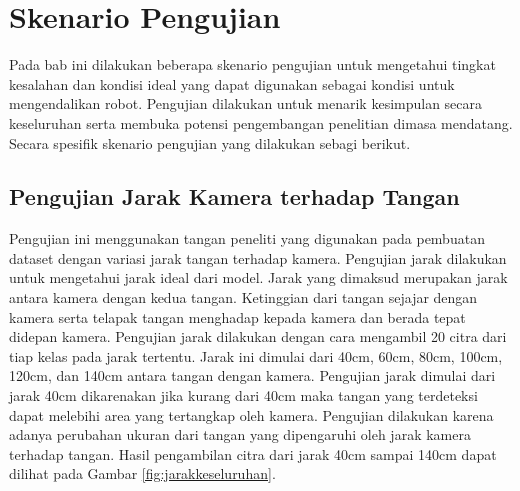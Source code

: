 \section{Skenario Pengujian}
Pada bab ini dilakukan beberapa skenario pengujian untuk mengetahui tingkat kesalahan dan kondisi ideal yang dapat digunakan sebagai kondisi untuk mengendalikan robot. Pengujian dilakukan untuk menarik kesimpulan secara keseluruhan serta membuka potensi pengembangan penelitian dimasa mendatang. Secara spesifik skenario pengujian yang dilakukan sebagi berikut.
\subsection{Pengujian Jarak Kamera terhadap Tangan}
\label{sub:jarak}
Pengujian ini menggunakan tangan peneliti yang digunakan pada pembuatan dataset dengan variasi jarak tangan terhadap kamera. Pengujian jarak dilakukan untuk mengetahui jarak ideal dari model. Jarak yang dimaksud merupakan jarak antara kamera dengan  kedua tangan. Ketinggian dari tangan sejajar dengan kamera serta telapak tangan menghadap kepada kamera dan berada tepat didepan kamera. Pengujian jarak dilakukan dengan cara mengambil 20 citra dari tiap kelas pada jarak tertentu. Jarak ini dimulai dari 40cm, 60cm, 80cm, 100cm, 120cm, dan 140cm antara tangan dengan kamera. Pengujian jarak dimulai dari jarak 40cm dikarenakan jika kurang dari 40cm maka tangan yang terdeteksi dapat melebihi area yang tertangkap oleh kamera. Pengujian dilakukan karena adanya perubahan ukuran dari tangan yang dipengaruhi oleh jarak kamera terhadap tangan. Hasil pengambilan citra dari jarak 40cm sampai 140cm dapat dilihat pada Gambar \ref{fig:jarakkeseluruhan}. 

